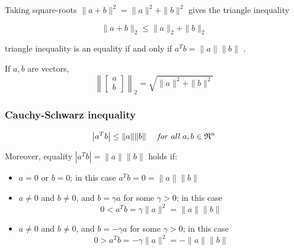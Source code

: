\begin{corollary}
    Taking square-roots $ \|a+b\|^{2}=\|a\|^{2}+\|b\|^{2} $ gives the triangle inequality

    \begin{equation}\| a + b \|_2 \le \|a \|_2 + \|b \|_2 \end{equation}

triangle inequality is an equality if and only if $ a^{T} b=\|a\|\|b\| $ .
\end{corollary}

\begin{corollary}
    If $ a, b $ are vectors,
\begin{equation}
\left\|\left[\begin{array}{l}
a \\
b
\end{array}\right]\right\|_2 =\sqrt{\|a\|^{2}+\|b\|^{2}}
\end{equation}
\end{corollary}

\subsubsection{Cauchy-Schwarz inequality}

\begin{theorem}
    \begin{equation} \left|a^{T} b\right| \leq\|a\|\|b\| \quad \term{ for all } a, b \in \mathfrak{R}^{n} \end{equation}
\end{theorem}

\begin{corollary}
    Moreover, equality $ \left|a^{T} b\right|=\|a\|\|b\| $ holds if:

\begin{itemize}
    \item $ a=0 $ or $ b=0 $; in this case $ a^{T} b=0=\|a\|\|b\| $
    \item $ a \neq 0 $ and $ b \neq 0 $, and $ b=\gamma a $ for some $ \gamma>0 $; in this case
    \begin{equation}
    0<a^{T} b=\gamma\|a\|^{2}=\|a\|\|b\|
    \end{equation}

    \item $ a \neq 0 $ and $ b \neq 0 $, and $ b=-\gamma a $ for some $ \gamma>0 $; in this case
    \begin{equation}
    0>a^{T} b=-\gamma\|a\|^{2}=-\|a\|\|b\|
    \end{equation}
\end{itemize}
\end{corollary}

